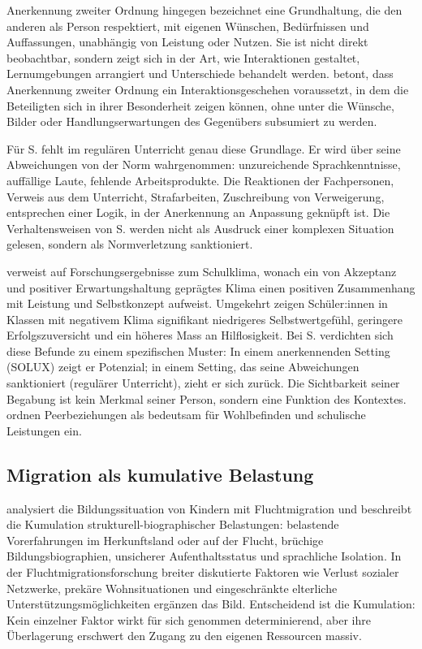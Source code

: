 \documentclass[ngerman, a4paper]{article}
\begin{document}
Anerkennung zweiter Ordnung hingegen bezeichnet eine Grundhaltung, die den anderen als
Person respektiert, mit eigenen Wünschen, Bedürfnissen und Auffassungen, unabhängig
von Leistung oder Nutzen. Sie ist nicht direkt beobachtbar, sondern zeigt sich in der
Art, wie Interaktionen gestaltet, Lernumgebungen arrangiert und Unterschiede behandelt
werden. \textcite[S.\,90\psq]{grossrieder2010anerkennung} betont, dass
Anerkennung zweiter Ordnung ein
Interaktionsgeschehen voraussetzt, in dem die Beteiligten sich in ihrer Besonderheit
zeigen können, ohne unter die Wünsche, Bilder oder Handlungserwartungen des
Gegenübers subsumiert zu werden.

Für S. fehlt im regulären Unterricht genau diese Grundlage. Er wird über seine
Abweichungen von der Norm wahrgenommen: unzureichende Sprachkenntnisse,
auffällige Laute, fehlende Arbeitsprodukte. Die Reaktionen der Fachpersonen,
Verweis aus dem Unterricht, Strafarbeiten, Zuschreibung von Verweigerung,
entsprechen einer Logik, in der Anerkennung an Anpassung geknüpft ist. Die
Verhaltensweisen von S. werden nicht als Ausdruck einer komplexen Situation gelesen,
sondern als Normverletzung sanktioniert.

\textcite[S.\,88\psq]{grossrieder2010anerkennung} verweist auf
Forschungsergebnisse zum Schulklima, wonach ein von
Akzeptanz und positiver Erwartungshaltung geprägtes Klima einen positiven Zusammenhang
mit Leistung und Selbstkonzept aufweist. Umgekehrt zeigen Schüler:innen in Klassen mit
negativem Klima signifikant niedrigeres Selbstwertgefühl, geringere Erfolgszuversicht
und ein höheres Mass an Hilflosigkeit. Bei S. verdichten sich diese Befunde zu einem
spezifischen Muster: In einem anerkennenden Setting (SOLUX) zeigt er Potenzial; in
einem Setting, das seine Abweichungen sanktioniert (regulärer Unterricht), zieht er
sich zurück. Die Sichtbarkeit seiner Begabung ist kein Merkmal seiner Person, sondern
eine Funktion des Kontextes.
\textcite[S.\,288]{kesselshannover2015gleichaltrige} ordnen
Peerbeziehungen als bedeutsam für Wohlbefinden und schulische
Leistungen ein.

\subsection{Migration als kumulative Belastung}

\textcite[S.\,86--98]{behrensen2019inklusive} analysiert die
Bildungssituation von Kindern mit Fluchtmigration und beschreibt die Kumulation
strukturell-biographischer Belastungen: belastende Vorerfahrungen im
Herkunftsland oder auf der Flucht, brüchige Bildungsbiographien, unsicherer
Aufenthaltsstatus und sprachliche Isolation. In der Fluchtmigrationsforschung
breiter diskutierte Faktoren wie Verlust sozialer Netzwerke, prekäre
Wohnsituationen und eingeschränkte elterliche Unterstützungsmöglichkeiten
ergänzen das Bild. Entscheidend ist die Kumulation: Kein einzelner Faktor
wirkt für sich genommen determinierend, aber ihre Überlagerung erschwert
den Zugang zu den eigenen Ressourcen massiv.
\end{document}
